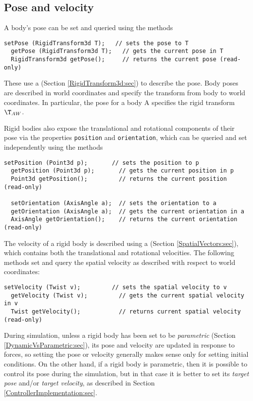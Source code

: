 \subsection{Pose and velocity}

A body's pose can be set and
queried using the methods
\begin{lstlisting}[]
  setPose (RigidTransform3d T);   // sets the pose to T
  getPose (RigidTransform3d T);   // gets the current pose in T
  RigidTransform3d getPose();     // returns the current pose (read-only)
\end{lstlisting}
%
These use a  (Section
\ref{RigidTransform3d:sec}) to describe the pose. Body poses are
described in world coordinates and specify the transform from body to
world coordinates. In particular, the pose for a body A specifies
the rigid transform $\T_{AW}$.

Rigid bodies also expose the translational and rotational components of
their pose via the properties {\tt position} and {\tt orientation},
which can be queried and set independently using the methods
\begin{lstlisting}[]
  setPosition (Point3d p);       // sets the position to p
  getPosition (Point3d p);       // gets the current position in p
  Point3d getPosition();         // returns the current position (read-only)

  setOrientation (AxisAngle a);  // sets the orientation to a
  getOrientation (AxisAngle a);  // gets the current orientation in a
  AxisAngle getOrientation();    // returns the current orientation (read-only)
\end{lstlisting}
%

The velocity of a rigid body is described using a
 (Section
\ref{SpatialVectors:sec}), which contains both the translational and
rotational velocities. The following methods
set and query the spatial velocity as described with respect to world
coordinates:
\begin{lstlisting}[]
  setVelocity (Twist v);         // sets the spatial velocity to v
  getVelocity (Twist v);         // gets the current spatial velocity in v
  Twist getVelocity();           // returns current spatial velocity (read-only)
\end{lstlisting}
%

During simulation, unless a rigid body has been set to be {\it
parametric} (Section \ref{DynamicVsParametric:sec}), its pose and
velocity are updated in response to forces, so setting the pose or
velocity generally makes sense only for setting initial conditions.
On the other hand, if a rigid body is parametric, then it is possible
to control its pose during the simulation, but in that case it is
better to set its {\it target pose} and/or {\it target velocity}, as
described in Section \ref{ControllerImplementation:sec}.

